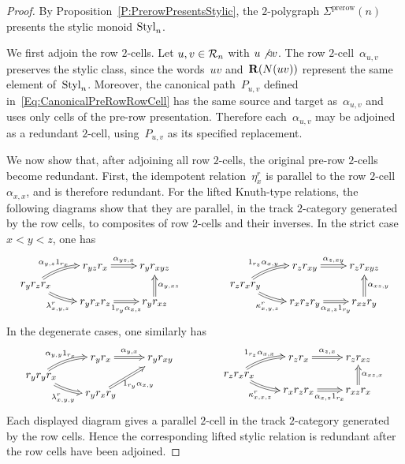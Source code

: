\documentclass[a4paper, twoside, 11pt, english]{article}
\begin{document}
\begin{proof}
By Proposition~\ref{P:PrerowPresentsStylic}, the $2$-polygraph
$\Sigma^{\mathrm{prerow}}(n)$ presents the stylic monoid $\mathrm{Styl}_n$.

We first adjoin the row $2$-cells. Let $u,v\in\mathcal{R}_n$ with
$u\not\triangleleft v$. 
The row $2$-cell~$\alpha_{u,v}$ preserves the stylic class, since the
words~$uv$ and~$\mathbf{R}(N(uv))$ represent the same element of~$\mathrm{Styl}_n$.  Moreover, the canonical path~$P_{u,v}$
defined in~\eqref{Eq:CanonicalPreRowRowCell} has the same source and target
as~$\alpha_{u,v}$ and uses only cells of the pre-row presentation.
Therefore each~$\alpha_{u,v}$ may be adjoined as a redundant $2$-cell,
using~$P_{u,v}$ as its specified replacement.

We now show that, after adjoining all row $2$-cells, the original pre-row
$2$-cells become redundant. First, the idempotent relation~$\eta_x^r$ is parallel to the row
$2$-cell~$\alpha_{x,x}$, and is therefore redundant.
For the lifted Knuth-type relations, the following diagrams show that they are
parallel, in the track $2$-category generated by the row cells, to composites
of row $2$-cells and their inverses. In the strict case $x<y<z$, one has
\[
\xymatrix @R=0.3em @C=2em @!C {
        & r_{yz}r_x
        \ar@2[r]^-{\alpha_{yz,x}}
        & r_y r_{xyz}
        \\
r_y r_z r_x
        \ar@2@/^/[ur]^-{\alpha_{y,z}1_{r_x}}
        \ar@2@/_/[dr]_-{\lambda_{x,y,z}^r}
        \\
        & r_y r_x r_z
        \ar@2[r]_-{1_{r_y}\alpha_{x,z}}
        & r_y r_{xz}
        \ar@2[uu]_-{\alpha_{y,xz}}
}
\qquad
\qquad
\xymatrix @R=0.3em @C=2em @!C {
        & r_z r_{xy}
        \ar@2[r]^-{\alpha_{z,xy}}
        & r_z r_{xyz}
        \\
r_z r_x r_y
        \ar@2@/^/[ur]^-{1_{r_z}\alpha_{x,y}}
        \ar@2@/_/[dr]_-{\kappa_{x,y,z}^r}
        \\
        & r_x r_z r_y
        \ar@2[r]_-{\alpha_{x,z}1_{r_y}}
        & r_{xz} r_y
        \ar@2[uu]_-{\alpha_{xz,y}}
}
\]
In the degenerate cases, one similarly has
\[
\xymatrix @R=0.3em @C=2em @!C {
        & r_y r_x
        \ar@2[r]^-{\alpha_{y,x}}
        & r_y r_{xy}
        \\
r_y r_y r_x
        \ar@2@/^/[ur]^-{\alpha_{y,y}1_{r_x}}
        \ar@2@/_/[dr]_-{\lambda_{x,y,y}^r}
        \\
        & r_y r_x r_y
        \ar@2[uur]_-{1_{r_y}\alpha_{x,y}}
}
\qquad
\qquad
\xymatrix @R=0.3em @C=2em @!C {
        &
        r_z r_x
        \ar@2[r]^-{\alpha_{z,x}}
        &
        r_z r_{xz}
        \\
r_z r_x r_x
        \ar@2@/^/[ur]^-{1_{r_z}\alpha_{x,x}}
        \ar@2@/_/[dr]_-{\kappa_{x,x,z}^r}
        \\
        &
        r_x r_z r_x
        \ar@2[r]_-{\alpha_{x,z}1_{r_x}}
        &
        r_{xz} r_x
        \ar@2[uu]_-{\alpha_{xz,x}}
}
\]
Each displayed diagram gives a parallel $2$-cell in the track $2$-category
generated by the row cells. Hence the corresponding lifted stylic relation is
redundant after the row cells have been adjoined.


\end{proof}
\end{document}
